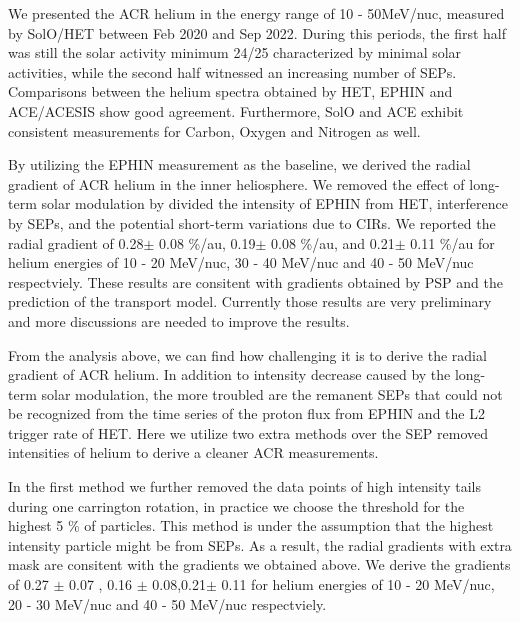 We presented the \ac{ACR} helium in the energy range of 10 - 50MeV/nuc, measured by \ac{SolO}/\ac{HET} between Feb 2020 and Sep 2022. During this periods, the first half was still the solar activity minimum 24/25 characterized by minimal solar activities, while the second half witnessed an increasing number of \acp{SEP}.
Comparisons between the helium spectra obtained by \ac{HET}, \ac{EPHIN} and \ac{ACE}/\ac{ACESIS} show good agreement. Furthermore, \ac{SolO} and \ac{ACE} exhibit consistent measurements for Carbon, Oxygen and Nitrogen as well.

By utilizing the \ac{EPHIN} measurement as the baseline, we derived the radial gradient of \ac{ACR} helium in the inner heliosphere. We removed the effect of long-term solar modulation by divided the intensity of \ac{EPHIN} from \ac{HET}, interference by \acp{SEP}, and the potential short-term variations due to \acp{CIR}.
We reported the radial gradient of 0.28$\pm$ 0.08 \%/au, 0.19$\pm$ 0.08 \%/au, and 0.21$\pm$ 0.11 \%/au for helium energies of 10 - 20 MeV/nuc, 30 - 40 MeV/nuc and 40 - 50 MeV/nuc respectviely. 
These results are consitent with gradients obtained by \ac{PSP} and the prediction of the transport model. Currently those results are very preliminary and more discussions are needed to improve the results.

From the analysis above, we can find how challenging it is to derive the radial gradient of \ac{ACR} helium. In addition to intensity decrease caused by the long-term solar modulation, the more troubled are the remanent \acp{SEP} that could not be recognized from the time series of the proton flux from \ac{EPHIN} and the L2 trigger rate of \ac{HET}. Here we utilize two extra methods over the \ac{SEP} removed intensities of helium to derive a cleaner \ac{ACR} measurements.

In the first method we further removed the data points of high intensity tails during one carrington rotation, in practice we choose the threshold for the highest 5 \% of particles. This method is under the assumption that the highest intensity particle might be from \acp{SEP}. As a result, the radial gradients with extra mask are consitent with the gradients we obtained above. We derive the gradients of 0.27 $\pm$ 0.07 , 0.16 $\pm$ 0.08,0.21$\pm$ 0.11 for helium energies of 10 - 20 MeV/nuc, 20 - 30 MeV/nuc and 40 - 50 MeV/nuc respectviely. 

